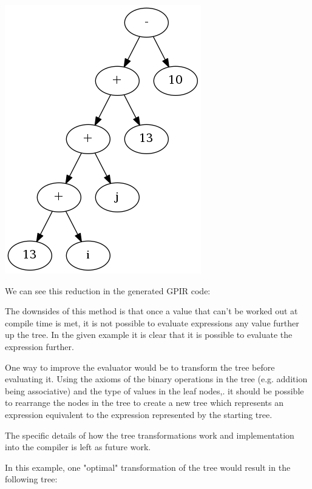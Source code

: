 \begin{center}
\includegraphics[scale=0.4]{graphs/fullyEvalTree.png}
\end{center}

We can see this reduction in the generated GPIR code:



The downsides of this method is that once
a value that can't be worked out at compile time is met, it is not possible
to evaluate expressions any value further up the tree. In the given example
it is clear that it is possible to evaluate the expression further.

One way to improve the evaluator would be to transform the tree before evaluating it.
Using the axioms of the binary operations in the tree (e.g. addition being associative)
and the type of values in the leaf nodes,. it should be possible to rearrange the nodes in the 
tree to create a new tree which represents an expression equivalent to the expression
represented by the starting tree.

The specific details of how the tree transformations work and implementation into the compiler is 
left as future work.

In this example, one "optimal" transformation of the tree would result in the following tree:

